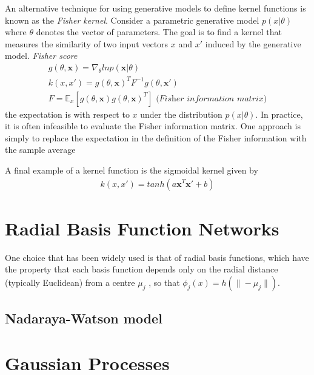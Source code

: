 \documentclass[a4paper]{article}
\begin{document}
An alternative technique for using generative models to define kernel
functions is known as the \textit{Fisher kernel}. Consider a
parametric generative model $p(x|\theta)$ where $\theta$ denotes the
vector of parameters. The goal is to find a kernel that measures the
similarity of two input vectors $x$ and $x'$ induced by the generative model.
\textit{Fisher score}
\begin{align}
g(\theta, \mathbf{x}) = \nabla_\theta ln p(\mathbf{x}|\theta)\\
k(x, x') = g(\theta, \mathbf{x})^T F^{-1} g(\theta, \mathbf{x'})\\
F = \mathbb{E}_x [g(\theta, \mathbf{x}) g(\theta, \mathbf{x})^T]
\textit{ (Fisher information matrix)}
\end{align}
the expectation is with respect to $x$ under the distribution $p(x|\theta)$.
In practice, it is often infeasible to evaluate the Fisher information
matrix. One approach is simply to replace the expectation in the
definition of the Fisher information with the sample average

A final example of a kernel function is the sigmoidal kernel given by
\begin{align}
k(x,x') = tanh(a \mathbf{x}^T \mathbf{x}' + b)
\end{align}

\section{Radial Basis Function Networks}
One choice that has been widely used is that of radial basis
functions, which have the property that each basis function depends
only on the radial distance (typically Euclidean) from a centre
$\mu_j$ , so that $\phi_j(x) = h(\| − \mu_j\|) $.

\subsection{Nadaraya-Watson model}

\section{Gaussian Processes}
\end{document}
